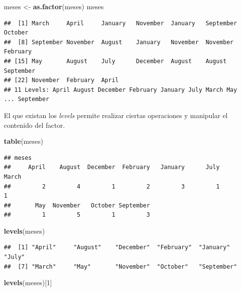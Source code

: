 \documentclass[
]{book}
\newenvironment{Shaded}{\begin{snugshade}}{\end{snugshade}}
\newcommand{\DecValTok}[1]{\textcolor[rgb]{0.00,0.00,0.81}{#1}}
\newcommand{\FunctionTok}[1]{\textcolor[rgb]{0.13,0.29,0.53}{\textbf{#1}}}
\newcommand{\NormalTok}[1]{#1}
\newcommand{\OtherTok}[1]{\textcolor[rgb]{0.56,0.35,0.01}{#1}}
\begin{document}
\begin{Shaded}
\begin{Highlighting}[]
\NormalTok{meses }\OtherTok{\textless{}{-}} \FunctionTok{as.factor}\NormalTok{(meses)}
\NormalTok{meses}
\end{Highlighting}
\end{Shaded}

\begin{verbatim}
##  [1] March     April     January   November  January   September October  
##  [8] September November  August    January   November  November  February 
## [15] May       August    July      December  August    August    September
## [22] November  February  April    
## 11 Levels: April August December February January July March May ... September
\end{verbatim}

El que existan los \emph{levels} permite realizar ciertas operaciones y manipular el contenido del factor.

\begin{Shaded}
\begin{Highlighting}[]
\FunctionTok{table}\NormalTok{(meses)}
\end{Highlighting}
\end{Shaded}

\begin{verbatim}
## meses
##     April    August  December  February   January      July     March 
##         2         4         1         2         3         1         1 
##       May  November   October September 
##         1         5         1         3
\end{verbatim}

\begin{Shaded}
\begin{Highlighting}[]
\FunctionTok{levels}\NormalTok{(meses)}
\end{Highlighting}
\end{Shaded}

\begin{verbatim}
##  [1] "April"     "August"    "December"  "February"  "January"   "July"     
##  [7] "March"     "May"       "November"  "October"   "September"
\end{verbatim}

\begin{Shaded}
\begin{Highlighting}[]
\FunctionTok{levels}\NormalTok{(meses)[}\DecValTok{1}\NormalTok{]}
\end{Highlighting}
\end{Shaded}
\end{document}
